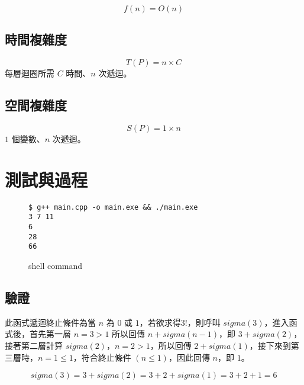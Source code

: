 \documentclass[12pt]{report}
\begin{document}
$$f(n) = O(n)$$

\section*{時間複雜度}

$$T(P) = n \times C$$
每層迴圈所需 $C$ 時間、$n$ 次遞迴。

\section*{空間複雜度}

$$S(P) = 1 \times n $$
$1$ 個變數、$n$ 次遞迴。

\chapter{測試與過程}

\begin{figure}[ht]
    \begin{verbatim}
$ g++ main.cpp -o main.exe && ./main.exe
3 7 11
6
28
66
    \end{verbatim}

    \captionsetup{justification=centering}
    \caption{shell command}
    \label{fig:shell command}
\end{figure}

\section*{驗證}

\hspace*{2em}此函式遞迴終止條件為當 $n$ 為 $0$ 或 $1$，若欲求得$3!$，則呼叫 $sigma(3)$，進入函式後，首先第一層 $n = 3 > 1$ 所以回傳 $n + sigma(n - 1)$，即 $3 + sigma(2)$，接著第二層計算 $sigma(2)$，$n = 2 > 1$，所以回傳 $2 + sigma(1)$，接下來到第三層時，$n = 1 \le 1$，符合終止條件 $(n \le 1)$，因此回傳 $n$，即 $1$。

$$sigma(3) = 3 + sigma(2) = 3 + 2 + sigma(1) = 3 + 2 + 1 = 6$$
\end{document}

